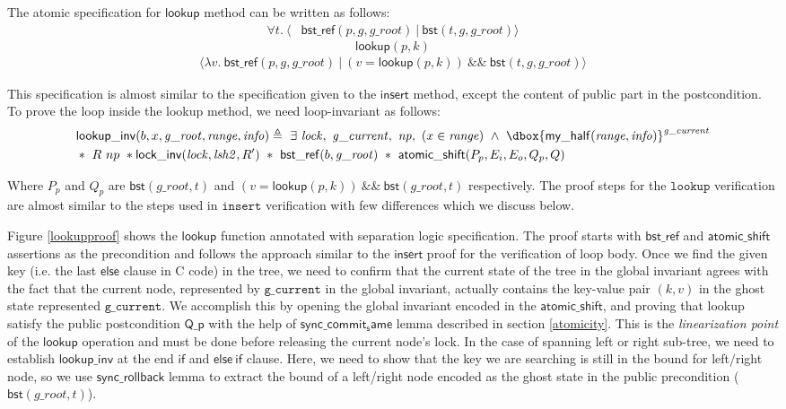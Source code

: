 \documentclass[acmsmall,screen]{acmart}\settopmatter{printfolios=true}
\newcommand\dboxed[1]{\dbox{\ensuremath{#1}}}
\newcommand{\ghost}[2]{\ensuremath{\dboxed{#1}^{#2}}}
\newcommand{\treerep}{\ensuremath{\mathsf{bst}}}
\newcommand{\nodeboxrep}{\ensuremath{\mathsf{bst\_ref}}}
\begin{document}
The atomic specification for $\mathsf{lookup}$ method can be written as follows:
\begin{align*} \forall t.\ \langle &\nodeboxrep(p,g,g\_root)\ |\ \treerep(t,g,g\_root)\rangle \end{align*} 
$$\mathsf{lookup}(p,k)$$ 
\begin{align*}\langle\lambda v.\ \nodeboxrep(p,g,g\_root)\ |\ (v = \mathsf{lookup}(p,k))\ \&\&\ \treerep(t,g,g\_root)\rangle \end{align*}

This specification is almost similar to the specification given to the $\mathsf{insert}$ method, except the content of public part in the postcondition. To prove the loop inside the lookup method, we need loop-invariant as follows:
\begin{align*} &\mathsf{lookup\_inv}(b, x, \mathit{g\_root}, \mathit{range},\mathit{info}) \triangleq\ \exists\ \mathit{lock},\ \mathit{g\_current},\ \mathit{np},\ (x\in \mathit{range})\ \land \ \ghost{\mathsf{my\_half}(\mathit{range},\mathit{info})}{\mathit{g\_current}}\\& *\ R\ np\ * \mathsf{lock\_inv}(\mathit{lock},\mathit{lsh2},R')\ *\ \nodeboxrep(b,\mathit{g\_root})\ *\ \mathsf{atomic\_shift} (P_p,E_i,E_o,Q_p,Q) \end{align*}  

Where $P_p$ and $Q_p$ are $\treerep(g\_root, t)$ and $(v = \mathsf{lookup}(p,k))\ \&\&\ \treerep(g\_root, t)$ respectively. The proof steps for the $\texttt{lookup}$ verification are almost similar to the steps used in $\texttt{insert}$ verification with few differences which we discuss below.


Figure \ref{lookupproof} shows the $\mathsf{lookup}$ function annotated with separation logic specification. The proof starts with $\nodeboxrep$ and $\mathsf{atomic\_shift}$ assertions as the precondition and follows the approach similar to the $\mathsf{insert}$ proof for the verification of loop body. Once we find the given key (i.e. the last $\mathsf{else}$ clause in C code) in the tree, we need to confirm that the current state of the tree in the global invariant agrees with the fact that the current node, represented by $\texttt{g\_current}$ in the global invariant, actually contains the key-value pair $(k, v)$ in the ghost state represented $\texttt{g\_current}$. We accomplish this by opening the global invariant encoded in the $\mathsf{atomic\_shift}$, and proving that lookup satisfy the public postcondition $\mathsf{Q\_p}$ with the help of $\mathsf{sync\_commit_same}$ lemma described in section \ref{atomicity}. This is the \emph{linearization point} of the $\mathsf{lookup}$ operation and must be done before releasing the current node's lock. In the case of spanning left or right sub-tree, we need to establish $\mathsf{lookup\_inv}$ at the end $\mathsf{if}$ and $\mathsf{else\ if}$ clause. Here, we need to show that the key we are searching is still in the bound for left/right node, so we use $\mathsf{sync\_rollback}$ lemma to extract the bound of a left/right node encoded as the ghost state in the public precondition ($\treerep(g\_root, t)$).
\end{document}
